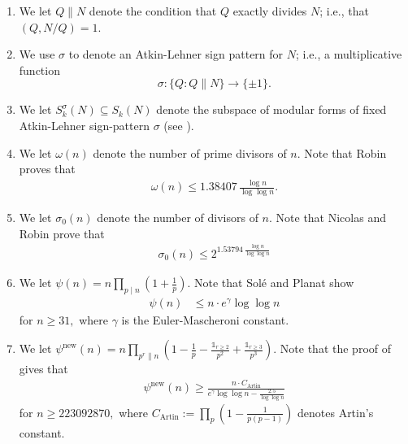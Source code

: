\documentclass[11pt,letterpaper,reqno]{amsart}
\theoremstyle{definition}
\numberwithin{equation}{section}
\numberwithin{figure}{section}
\numberwithin{table}{section}
\newcommand{\lrp}[1]{\!\left(#1\right)}
\newcommand{\nw}{\mathrm{new}}
\begin{document}
\begin{enumerate}
    \item We let $Q \| N$ denote the condition that $Q$ exactly divides $N$; i.e., that $(Q, N/Q) = 1.$
    \item We use $\sigma$ to denote an Atkin-Lehner sign pattern for $N$; i.e., a multiplicative function
    $$\sigma : \{ Q : Q \| N \} \longrightarrow \{ \pm 1 \}.$$
    \item We let $S_k^{\sigma}(N) \subseteq S_k(N)$ denote the subspace of modular forms of fixed Atkin-Lehner sign-pattern $\sigma$ (see \cite[\S1.2]{KMRX}).
    \item We let $\omega(n)$ denote the number of prime divisors of $n.$ Note that Robin \cite[Th\'eor\`eme 11]{Rob83} proves that
    \begin{align}
        \omega(n) \leq 1.38407 \, \frac{\log n}{\log \log n}. \label{eqn:robin-omega-bound}
    \end{align}
    \item We let $\sigma_0(n)$ denote the number of divisors of $n.$ Note that Nicolas and Robin \cite[Th\'eor\`eme 1]{NR83} prove that
    \begin{align}
        \sigma_0(n) \leq 2^{1.53794 \, \frac{\log n}{\log \log n}} \label{eqn:nicolas-robin-sigma-bound}
    \end{align}
    \item We let $\psi(n) = n \prod_{p \mid n} \left(1 + \frac{1}{p} \right).$ Note that Sol\'e and Planat \cite[Corollary 2]{sole2011extreme} show
    \begin{align}
        \psi(n) &\leq n \cdot e^\gamma \log   \log n \label{eqn:Sole-Planat-psi-bound}
    \end{align}
    for $n \geq 31,$ where $\gamma$ is the Euler-Mascheroni constant.
    \item We let $\psi^\nw(n) = n \prod_{p^r \| n} \left( 1 - \frac{1}{p} - \frac{\mathds{1}_{r \geq 2}}{p^2} + \frac{\mathds{1}_{r \geq 3}}{p^3} \right).$ Note that the proof of \cite[Lemma 3.6]{KMRX} gives that
    \begin{align}
        \psi^{\nw}(n) \geq \frac{n \cdot C_{\text{Artin}}}{e^{\gamma} \log \log n - \frac{2.5}{\log \log n}} \label{eqn:bound-on-psi-new}
    \end{align}
    for $n \geq 223092870,$ where $C_{\text{Artin}} := \prod_p \lrp{1 - \frac{1}{p(p-1)}}$ denotes Artin's constant.
\end{enumerate}
\end{document}
